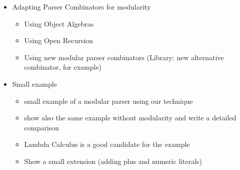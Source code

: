 \begin{itemize}
\begin{itemize}
    \end{itemize}
\item Adapting Parser Combinators for modularity
    \begin{itemize}
    \item Using Object Algebras
    \item Using Open Recursion
    \item Using new modular parser combinators (Library: new alternative combinator, for example)
    \end{itemize}
\item Small example
    \begin{itemize}
    \item small example of a modular parser using our technique
    \item show also the same example without modularity and write a detailed comparison
    \item Lambda Calculus is a good candidate for the example
    \item Show a small extension (adding plus and numeric literals)
    \end{itemize}
\end{itemize}

